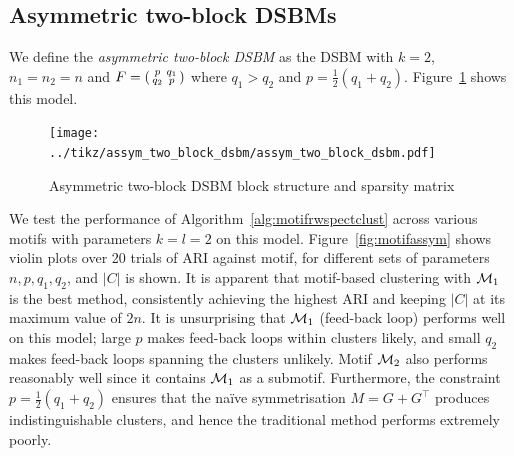 \subsection{Asymmetric two-block DSBMs} \label{sec:motif_asymm_dsbms}

We define the \emph{asymmetric two-block DSBM} as the DSBM with $k=2$, $n_1=n_2=n$ and $F = \begin{psmallmatrix} p & q_1 \\ q_2 & p \end{psmallmatrix}$ where $q_1 > q_2$ and $p = \frac{1}{2}(q_1+q_2)$. Figure~\ref{fig:assym_two_block_dsbm} shows this model. 


\begin{figure}[H]
	\centering
	\texttt{[image: ../tikz/assym\_two\_block\_dsbm/assym\_two\_block\_dsbm.pdf]}
	\caption{Asymmetric two-block DSBM block structure and sparsity matrix}
	\label{fig:assym_two_block_dsbm}
\end{figure}

We test the performance of Algorithm~\ref{alg:motifrwspectclust} across various motifs with parameters $k=l=2$ on this model.
Figure~\ref{fig:motifassym} shows violin plots over 20 trials of ARI against motif, for different sets of parameters $n,p,q_1,q_2$, and $|C|$ is shown.
It is apparent that motif-based clustering with $\mathcal{M}_1$ is the best method, consistently achieving the highest ARI and keeping $|C|$ at its maximum value of $2n$.
It is unsurprising that $\mathcal{M}_1$ (feed-back loop) performs well on this model; large $p$ makes feed-back loops within clusters likely, and small $q_2$ makes feed-back loops spanning the clusters unlikely. Motif $\mathcal{M}_2$ also performs reasonably well since it contains $\mathcal{M}_1$ as a submotif.
Furthermore, the constraint $p = \frac{1}{2}(q_1+q_2)$ ensures that the na\"ive symmetrisation $M=G+G^\top$ produces indistinguishable clusters, and hence the traditional method performs extremely poorly.


